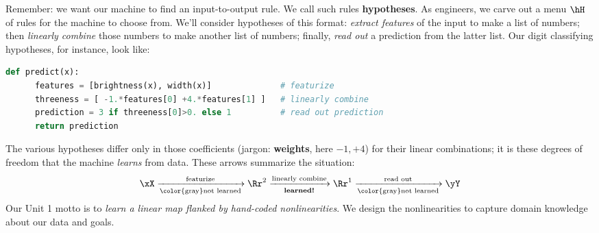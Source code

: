 

  Remember: we want our machine to find an input-to-output rule.  We call
  such rules \textbf{hypotheses}.  As engineers, we carve out a menu $\hH$ of
  rules for the machine to choose from.
  We'll consider
  hypotheses of this format:
  \emph{extract features} of the input to make a list of numbers; then
  \emph{linearly combine} those numbers to make another list of numbers;
  finally,
  \emph{read out} a prediction %
  from the latter list.
  Our digit classifying hypotheses, for instance, look like:
  \begin{lstlisting}[language=Python, basicstyle=\footnotesize\ttfamily]
    def predict(x):
      features = [brightness(x), width(x)]              # featurize
      threeness = [ -1.*features[0] +4.*features[1] ]   # linearly combine
      prediction = 3 if threeness[0]>0. else 1          # read out prediction
      return prediction
  \end{lstlisting}
  The various hypotheses differ only in those coefficients (jargon:
  \textbf{weights}, here $-1, +4$) for their linear combinations; it is these
  degrees of freedom that the machine \emph{learns} from data.
  These arrows summarize the situation:
  \[
    \xX   \xrightarrow[\text{\color{gray}not learned}]{\text{featurize}}
    \Rr^2 \xrightarrow[\text{\textbf{learned!}}]{\text{linearly combine}}
    \Rr^1 \xrightarrow[\text{\color{gray}not learned}]{\text{read out}}
    \yY
  \]
  Our Unit 1 motto is to \emph{learn a linear map flanked by hand-coded
  nonlinearities}.  We design the nonlinearities to capture domain knowledge
  about our data and goals.

